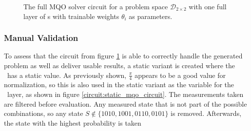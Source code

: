 \begin{figure}[!h]
    \centering
    \caption{The full MQO solver circuit for a problem space $\mathcal{D}_{2\times2}$ with one full layer of \rxgate s with trainable weights $\theta_i$ as parameters.}
    \label{circuit:full_trainable_mqp_circuit}
\end{figure}

\subsubsection{Manual Validation}
\label{chapter:mqo_manual_validation}
To assess that the circuit from figure \ref{circuit:full_trainable_mqp_circuit} is able to correctly handle the generated problem as well as deliver usable results, a static variant is created where the \rxgate\ has a static value. As previously shown, $\frac{\pi}{4}$ appears to be a good value for normalization, so this is also used in the static variant as the variable for the \rxgate\ layer, as shown in figure \ref{circuit:static_mqo_circuit}. The measurements taken are filtered before evaluation. Any measured state that is not part of the possible combinations, so any state $S \notin \{1010, 1001, 0110, 0101\}$ is removed. Afterwards, the state with the highest probability is taken

